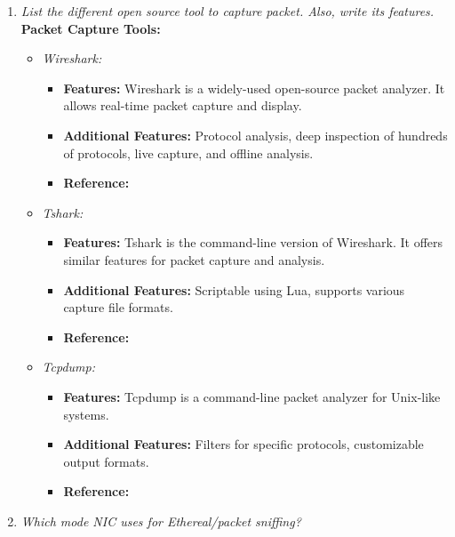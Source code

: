 \documentclass[11pt]{article}
\begin{document}
\begin{enumerate}
	\item \textit{List the different open source tool to capture packet. Also, write its
		      features.}\\

	      \textbf{Packet Capture Tools:}
	      \begin{itemize}
		      \item \textit{Wireshark:}
		            \begin{itemize}
			            \item \textbf{Features:} Wireshark is a widely-used open-source packet analyzer. It allows real-time packet capture and display.
			            \item \textbf{Additional Features:} Protocol analysis, deep inspection of hundreds of protocols, live capture, and offline analysis.
			            \item \textbf{Reference:} \cite{wireshark}
		            \end{itemize}

		      \item \textit{Tshark:}
		            \begin{itemize}
			            \item \textbf{Features:} Tshark is the command-line version of Wireshark. It offers similar features for packet capture and analysis.
			            \item \textbf{Additional Features:} Scriptable using Lua, supports various capture file formats.
			            \item \textbf{Reference:} \cite{tshark}
		            \end{itemize}

		      \item \textit{Tcpdump:}
		            \begin{itemize}
			            \item \textbf{Features:} Tcpdump is a command-line packet analyzer for Unix-like systems.
			            \item \textbf{Additional Features:} Filters for specific protocols, customizable output formats.
			            \item \textbf{Reference:} \cite{tcpdump}
		            \end{itemize}
	      \end{itemize}

	\item \textit{Which mode NIC uses for Ethereal/packet sniffing?}\\


\end{enumerate}
\end{document}
